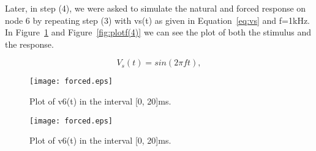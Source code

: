 Later, in step (4), we were asked to simulate the natural and forced response on node 6 by repeating step (3) with vs(t) as given in Equation~\ref{eq:vs} and f=1kHz. In Figure~\ref{fig:plots(4)} and Figure~\ref{fig:plotf(4)} we can see the plot of both the stimulus and the response.

\begin{equation}
  V_{s}(t) = sin(2 \pi f t),
  \label{eq:vs}
\end{equation}

\begin{figure}[h] \centering
\texttt{[image: forced.eps]}
\caption{Plot of v6(t) in the interval [0, 20]ms.}
\label{fig:plots(4)}
\end{figure}

\begin{figure}[h] \centering
\texttt{[image: forced.eps]}
\caption{Plot of v6(t) in the interval [0, 20]ms.}
\label{fig:plotr(4)}
\end{figure}



